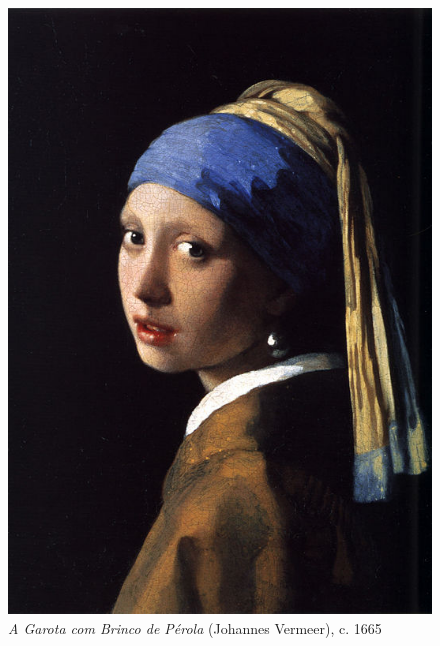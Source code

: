 \begin{figure}
  \vspace{-15pt}
  \begin{centering}
    \caption{\emph{A Garota com Brinco de Pérola} (Johannes Vermeer), c. 1665}
    \label{fig:vermeer:perola}
    \includegraphics[scale=1.2]{figs/vermeer_perola.png}
  \end{centering}
\end{figure}

